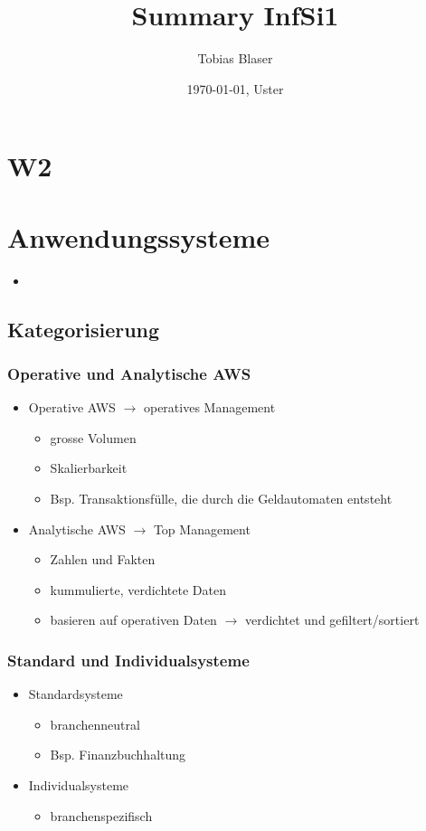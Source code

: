 \documentclass[ngerman,a4paper,12pt]{scrreprt}
\title{Summary InfSi1}
\author{Tobias Blaser}
\date{\today{}, Uster}
\begin{document}
\tableofcontents
\clearpage

\chapter{W2}

\chapter{Anwendungssysteme}

\begin{itemize}
	\item 
\end{itemize}

\section{Kategorisierung}
\subsection{Operative und Analytische AWS}
\begin{itemize}
	\item Operative AWS $\rightarrow$ operatives Management
		\begin{itemize}
			\item grosse Volumen
			\item Skalierbarkeit
			\item Bsp. Transaktionsfülle, die durch die Geldautomaten entsteht
		\end{itemize}
	\item Analytische AWS $\rightarrow$ Top Management
		\begin{itemize}
			\item Zahlen und Fakten
			\item kummulierte, verdichtete Daten
			\item basieren auf operativen Daten $\rightarrow$ verdichtet und gefiltert/sortiert
		\end{itemize}
\end{itemize}

\subsection{Standard und Individualsysteme}
\begin{itemize}
	\item Standardsysteme
		\begin{itemize}
			\item branchenneutral
			\item Bsp. Finanzbuchhaltung
		\end{itemize}
	\item Individualsysteme
		\begin{itemize}
			\item branchenspezifisch
		\end{itemize}
\end{itemize}
\end{document}
